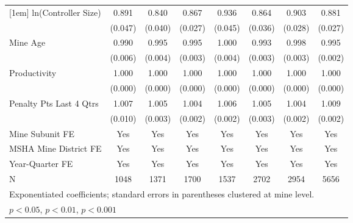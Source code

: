 {\begin{tabular}{l*{7}{c}}
[1em]
ln(Controller Size)      &       0.891\sym{*}  &       0.840\sym{***}&       0.867\sym{***}&       0.936         &       0.864\sym{***}&       0.903\sym{***}&       0.881\sym{***}\\
                         &     (0.047)         &     (0.040)         &     (0.027)         &     (0.045)         &     (0.036)         &     (0.028)         &     (0.027)         \\
[1em]
Mine Age                 &       0.990         &       0.995         &       0.995         &       1.000         &       0.993         &       0.998         &       0.995\sym{*}  \\
                         &     (0.006)         &     (0.004)         &     (0.003)         &     (0.004)         &     (0.003)         &     (0.003)         &     (0.002)         \\
[1em]
Productivity             &       1.000\sym{*}  &       1.000         &       1.000         &       1.000         &       1.000\sym{*}  &       1.000\sym{*}  &       1.000         \\
                         &     (0.000)         &     (0.000)         &     (0.000)         &     (0.000)         &     (0.000)         &     (0.000)         &     (0.000)         \\
[1em]
Penalty Pts Last 4 Qtrs  &       1.007         &       1.005         &       1.004         &       1.006\sym{*}  &       1.005         &       1.004\sym{*}  &       1.009\sym{***}\\
                         &     (0.010)         &     (0.003)         &     (0.002)         &     (0.002)         &     (0.003)         &     (0.002)         &     (0.002)         \\
[1em]
Mine Subunit FE          &         Yes         &         Yes         &         Yes         &         Yes         &         Yes         &         Yes         &         Yes         \\
[1em]
MSHA Mine District FE    &         Yes         &         Yes         &         Yes         &         Yes         &         Yes         &         Yes         &         Yes         \\
[1em]
Year-Quarter FE          &         Yes         &         Yes         &         Yes         &         Yes         &         Yes         &         Yes         &         Yes         \\
\hline
N                        &        1048         &        1371         &        1700         &        1537         &        2702         &        2954         &        5656         \\
\hline\hline
\multicolumn{8}{l}{\footnotesize Exponentiated coefficients; standard errors in parentheses clustered at mine level.}\\
\multicolumn{8}{l}{\footnotesize \sym{*} \(p<0.05\), \sym{**} \(p<0.01\), \sym{***} \(p<0.001\)}\\
\end{tabular}
}
